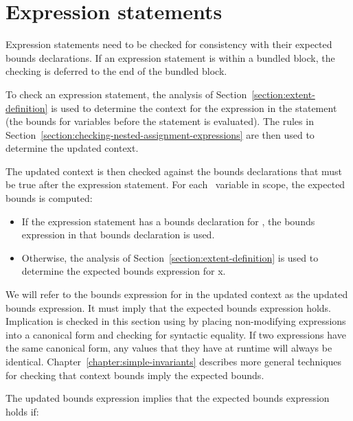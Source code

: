 \section{Expression statements}
\label{section:checking-expression-statements}

Expression statements need to be checked for consistency with their
expected bounds declarations. If an expression statement is within a
bundled block, the checking is deferred to the end of the bundled block.

To check an expression statement, the analysis of 
Section~\ref{section:extent-definition} is used
to determine the context for the expression in the statement (the bounds
for variables before the statement is evaluated). The rules in 
Section~\ref{section:checking-nested-assignment-expressions}
are then used to determine the updated context.

The updated context is then checked against the bounds declarations that
must be true after the expression statement. For each
\arrayptr\ variable  in scope, the expected bounds is
computed:

\begin{itemize}
\item
  If the expression statement has a bounds declaration for , the
  bounds expression in that bounds declaration is used.
\item
  Otherwise, the analysis of Section~\ref{section:extent-definition}
  is used to determine the
  expected bounds expression for x.
\end{itemize}

We will refer to the bounds expression for  in the updated context
as the updated bounds expression.  It must imply that the
expected bounds expression holds. Implication is checked in this section
using by placing non-modifying expressions into a canonical form and
checking for syntactic equality. If two expressions have the same
canonical form, any values that they have at runtime will always be
identical. Chapter~\ref{chapter:simple-invariants}
describes more general techniques for checking
that context bounds imply the expected bounds.

The updated bounds expression implies that the expected bounds
expression holds if:

